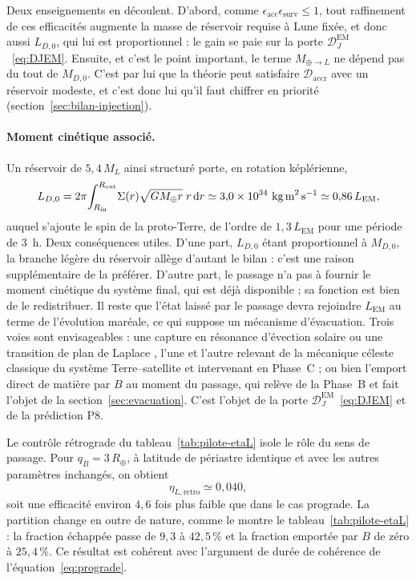 \documentclass[11pt,a4paper,openany]{report}
\newcommand{\Mt}{M_{\oplus}}
\newcommand{\Rt}{R_{\oplus}}
\newcommand{\dd}{\mathrm{d}}
\begin{document}
Deux enseignements en découlent. D'abord, comme
$\epsilon_{\mathrm{acc}}\epsilon_{\mathrm{surv}}\le1$, tout raffinement de ces efficacités augmente
la masse de réservoir requise à Lune fixée, et donc aussi $L_{D,0}$, qui lui est proportionnel : le
gain se paie sur la porte $\mathcal{D}_J^{\mathrm{EM}}$~\eqref{eq:DJEM}. Ensuite, et c'est le point
important, le terme $M_{\oplus\to L}$ ne dépend pas du tout de $M_{D,0}$. C'est par lui que la
théorie peut satisfaire $\mathcal{D}_{\mathrm{accr}}$ avec un réservoir modeste, et c'est donc lui
qu'il faut chiffrer en priorité (section~\ref{sec:bilan-injection}).

\paragraph{Moment cinétique associé.}
Un réservoir de $5{,}4\,M_L$ ainsi structuré porte, en rotation képlérienne,
\begin{equation}
L_{D,0}=2\pi\!\int_{R_{\mathrm{in}}}^{R_{\mathrm{out}}}\!\Sigma(r)\sqrt{G\Mt r}\;r\,\dd r
\simeq3{,}0\times10^{34}\ \text{kg\,m}^2\,\text{s}^{-1}\simeq0{,}86\,L_{\mathrm{EM}},
\label{eq:LD-reservoir}
\end{equation}
auquel s'ajoute le spin de la proto-Terre, de l'ordre de $1{,}3\,L_{\mathrm{EM}}$ pour une période
de $3$~h. Deux conséquences utiles. D'une part, $L_{D,0}$ étant proportionnel à $M_{D,0}$, la
branche légère du réservoir allège d'autant le bilan : c'est une raison supplémentaire de la
préférer. D'autre part, le passage n'a pas à fournir le moment cinétique du système final, qui est
déjà disponible ; sa fonction est bien de le redistribuer. Il reste que l'état laissé par le
passage devra rejoindre $L_{\mathrm{EM}}$ au terme de l'évolution maréale, ce qui suppose un
mécanisme d'évacuation. Trois voies sont envisageables : une capture en résonance d'évection
solaire ou une transition de plan de Laplace \cite{MurrayDermott1999,TremaineTouma2009}, l'une et
l'autre relevant de la mécanique céleste classique du système Terre--satellite et intervenant en
Phase~C ; ou bien l'emport direct de matière par $B$ au moment du passage, qui relève de la Phase~B
et fait l'objet de la section~\ref{sec:evacuation}. C'est
l'objet de la porte $\mathcal{D}_J^{\mathrm{EM}}$~\eqref{eq:DJEM} et de la prédiction P8.

Le contrôle rétrograde du tableau~\ref{tab:pilote-etaL} isole le rôle du sens de passage. Pour $q_B=3\,\Rt$, à latitude de
périastre identique et avec les autres paramètres inchangés, on obtient
\begin{equation}
\eta_{L,\mathrm{retro}}\simeq0{,}040,
\label{eq:retro-pilote}
\end{equation}
soit une efficacité environ $4{,}6$ fois plus faible que dans le cas prograde. La partition change
en outre de nature, comme le montre le tableau~\ref{tab:pilote-etaL} : la fraction échappée passe
de $9{,}3$ à $42{,}5\,\%$ et la fraction emportée par $B$ de zéro à $25{,}4\,\%$. Ce résultat est cohérent
avec l'argument de durée de cohérence de l'équation~\eqref{eq:prograde}.
\end{document}
